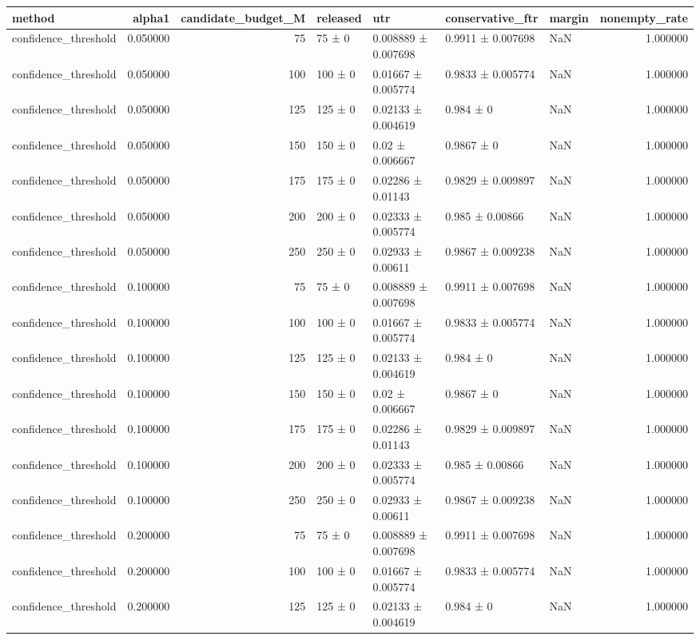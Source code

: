 \begin{tabular}{lrrllllr}
\toprule
method & alpha1 & candidate_budget_M & released & utr & conservative_ftr & margin & nonempty_rate \\
\midrule
confidence_threshold & 0.050000 & 75 & 75 ± 0 & 0.008889 ± 0.007698 & 0.9911 ± 0.007698 & NaN & 1.000000 \\
confidence_threshold & 0.050000 & 100 & 100 ± 0 & 0.01667 ± 0.005774 & 0.9833 ± 0.005774 & NaN & 1.000000 \\
confidence_threshold & 0.050000 & 125 & 125 ± 0 & 0.02133 ± 0.004619 & 0.984 ± 0 & NaN & 1.000000 \\
confidence_threshold & 0.050000 & 150 & 150 ± 0 & 0.02 ± 0.006667 & 0.9867 ± 0 & NaN & 1.000000 \\
confidence_threshold & 0.050000 & 175 & 175 ± 0 & 0.02286 ± 0.01143 & 0.9829 ± 0.009897 & NaN & 1.000000 \\
confidence_threshold & 0.050000 & 200 & 200 ± 0 & 0.02333 ± 0.005774 & 0.985 ± 0.00866 & NaN & 1.000000 \\
confidence_threshold & 0.050000 & 250 & 250 ± 0 & 0.02933 ± 0.00611 & 0.9867 ± 0.009238 & NaN & 1.000000 \\
confidence_threshold & 0.100000 & 75 & 75 ± 0 & 0.008889 ± 0.007698 & 0.9911 ± 0.007698 & NaN & 1.000000 \\
confidence_threshold & 0.100000 & 100 & 100 ± 0 & 0.01667 ± 0.005774 & 0.9833 ± 0.005774 & NaN & 1.000000 \\
confidence_threshold & 0.100000 & 125 & 125 ± 0 & 0.02133 ± 0.004619 & 0.984 ± 0 & NaN & 1.000000 \\
confidence_threshold & 0.100000 & 150 & 150 ± 0 & 0.02 ± 0.006667 & 0.9867 ± 0 & NaN & 1.000000 \\
confidence_threshold & 0.100000 & 175 & 175 ± 0 & 0.02286 ± 0.01143 & 0.9829 ± 0.009897 & NaN & 1.000000 \\
confidence_threshold & 0.100000 & 200 & 200 ± 0 & 0.02333 ± 0.005774 & 0.985 ± 0.00866 & NaN & 1.000000 \\
confidence_threshold & 0.100000 & 250 & 250 ± 0 & 0.02933 ± 0.00611 & 0.9867 ± 0.009238 & NaN & 1.000000 \\
confidence_threshold & 0.200000 & 75 & 75 ± 0 & 0.008889 ± 0.007698 & 0.9911 ± 0.007698 & NaN & 1.000000 \\
confidence_threshold & 0.200000 & 100 & 100 ± 0 & 0.01667 ± 0.005774 & 0.9833 ± 0.005774 & NaN & 1.000000 \\
confidence_threshold & 0.200000 & 125 & 125 ± 0 & 0.02133 ± 0.004619 & 0.984 ± 0 & NaN & 1.000000 \\

\end{tabular}
